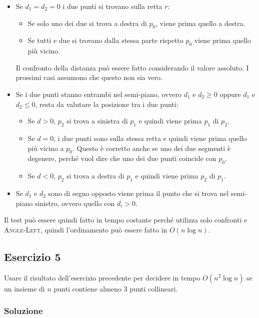 \begin{itemize}
	\item Se $d_1 = d_2 = 0$ i due punti si trovano sulla retta $r$:
	\begin{itemize}
		\item Se solo uno dei due si trova a destra di $p_0$, viene prima quello a destra.
		\item Se tutti e due si trovano dalla stessa parte rispetto $p_0$ viene prima quello più vicino.
	\end{itemize}
	Il confronto della distanza può essere fatto considerando il valore assoluto. I prossimi casi assumono che questo non sia vero.
	\item Se i due punti stanno entrambi nel semi-piano, ovvero $d_1$ e $d_2 \geq 0$ oppure $d_1$ e $d_2 \leq 0$, resta da valutare la posizione tra i due punti:
	\begin{itemize}
		\item Se $d >0 $, $p_2$ si trova a sinistra di $p_1$ e quindi viene prima $p_1$ di $p_2$.
		\item Se $d = 0$, i due punti sono sulla stessa retta e quindi viene prima quello più vicino a $p_0$. Questo è corretto anche se uno dei due segmenti è degenere, perché vuol dire che uno dei due punti coincide con $p_0$.
		\item Se $d < 0$, $p_2$ si trova a destra di $p_1$ e quindi viene prima $p_2$ di $p_1$.
	\end{itemize}
	\item Se $d_1$ e $d_2$ sono di segno opposto viene prima il punto che si trova nel semi-piano sinistro, ovvero quello con $d_i > 0$. 
\end{itemize}

Il test può essere quindi fatto in tempo costante perché utilizza solo confronti e \textsc{Angle-Left}, quindi l'ordinamento può essere fatto in $O(n \log n)$.

\subsection{Esercizio 5}\label{esercizio-5}

Usare il risultato dell'esercizio precedente per decidere in tempo $O(n^2 \log n)$ se un insieme di $n$ punti contiene almeno 3 punti collineari.

\subsubsection{Soluzione}

